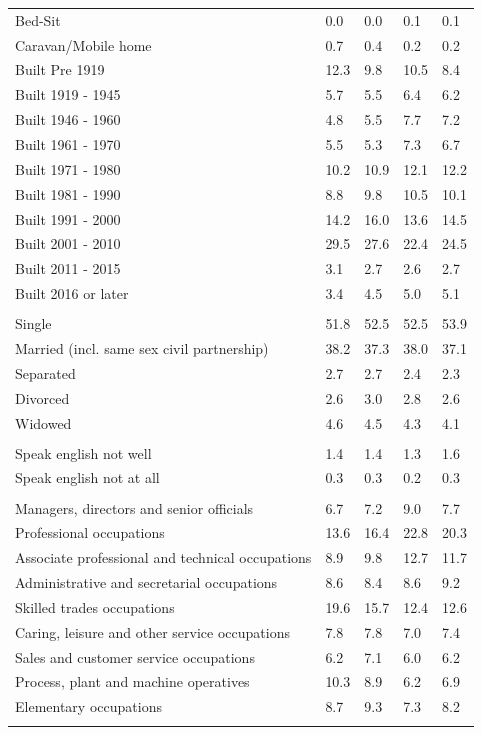 \documentclass{article}
\begin{document}
\begin{table}[h]
\begin{tabular}{KTTTT}
Bed-Sit & 0.0& 0.0& 0.1& 0.1\\
Caravan/Mobile home & 0.7& 0.4& 0.2& 0.2\\
    \hline
Built Pre 1919 & 12.3&  9.8& 10.5&  8.4\\
Built 1919 - 1945 & 5.7& 5.5& 6.4& 6.2\\
Built  1946 - 1960 & 4.8& 5.5& 7.7& 7.2\\
Built  1961 - 1970 & 5.5& 5.3& 7.3& 6.7\\
Built  1971 - 1980 & 10.2& 10.9& 12.1& 12.2\\
Built  1981 - 1990 &  8.8&  9.8& 10.5& 10.1\\
Built  1991 - 2000 & 14.2& 16.0& 13.6& 14.5\\
Built  2001 - 2010 & 29.5& 27.6& 22.4& 24.5\\
Built  2011 - 2015 & 3.1& 2.7& 2.6& 2.7\\
Built  2016 or later & 3.4& 4.5& 5.0& 5.1\\
\hline
    \\
    \hline
Single & 51.8& 52.5& 52.5& 53.9\\
Married (incl. same sex civil partnership) & 38.2& 37.3& 38.0& 37.1\\
Separated  & 2.7& 2.7& 2.4& 2.3\\
Divorced  & 2.6& 3.0& 2.8& 2.6\\
Widowed & 4.6& 4.5& 4.3& 4.1\\
\hline
    \\ 
    \hline
Speak english not well & 1.4& 1.4& 1.3& 1.6\\
Speak english not at all & 0.3& 0.3& 0.2& 0.3\\
\hline
    \\
    \hline
Managers, directors and senior officials & 6.7& 7.2& 9.0& 7.7\\
Professional occupations & 13.6& 16.4& 22.8& 20.3\\
Associate professional and technical occupations &  8.9&  9.8& 12.7& 11.7\\
Administrative and secretarial occupations & 8.6& 8.4& 8.6& 9.2\\
Skilled trades occupations & 19.6& 15.7& 12.4& 12.6\\
Caring, leisure and other service occupations & 7.8& 7.8& 7.0& 7.4\\
Sales and customer service occupations & 6.2& 7.1& 6.0& 6.2\\
Process, plant and machine operatives & 10.3&  8.9&  6.2&  6.9\\
Elementary occupations & 8.7& 9.3& 7.3& 8.2\\
\hline
\end{tabular}
\end{table}
\end{document}
